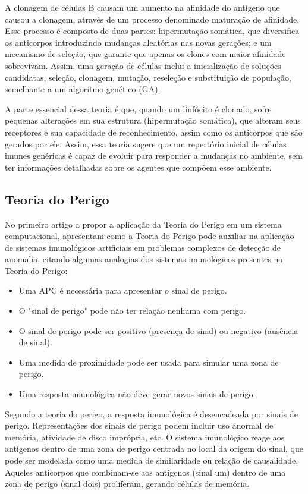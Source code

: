 A clonagem de células B causam um aumento na afinidade do antígeno que causou a clonagem, através de um processo denominado maturação de afinidade. Esse processo é composto de duas partes: hipermutação somática, que diversifica os anticorpos introduzindo mudanças aleatórias nas novas gerações; e um mecanismo de seleção, que garante que apenas os clones com maior afinidade sobrevivam. Assim, uma geração de células inclui a inicialização de soluções candidatas, seleção, clonagem, mutação, reseleção e substituição de população, semelhante a um algoritmo genético (GA).

A parte essencial dessa teoria é que, quando um linfócito é clonado, sofre pequenas alterações em sua estrutura (hipermutação somática), que alteram seus receptores e sua capacidade de reconhecimento, assim como os anticorpos que são gerados por ele. Assim, essa teoria sugere que um repertório inicial de células imunes genéricas é capaz de evoluir para responder a mudanças no ambiente, sem ter informações detalhadas sobre os agentes que compõem esse ambiente.

\subsection{Teoria do Perigo}

No primeiro artigo a propor a aplicação da Teoria do Perigo em um sistema computacional, \citeauthor{Aickelin2002} apresentam como a Teoria do Perigo pode auxiliar na aplicação de sistemas imunológicos artificiais em problemas complexos de detecção de anomalia, citando algumas analogias dos sistemas imunológicos presentes na Teoria do Perigo:

\begin{itemize}
    \item Uma APC é necessária para apresentar o sinal de perigo.
    \item O "sinal de perigo" pode não ter relação nenhuma com perigo.
    \item O sinal de perigo pode ser positivo (presença de sinal) ou negativo (ausência de sinal).
    \item Uma medida de proximidade pode ser usada para simular uma zona de perigo.
    \item Uma resposta imunológica não deve gerar novos sinais de perigo.
\end{itemize}

Segundo a teoria do perigo, a resposta imunológica é desencadeada por sinais de perigo. Representações dos sinais de perigo podem incluir uso anormal de memória, atividade de disco imprópria, etc. O sistema imunológico reage aos antígenos dentro de uma zona de perigo centrada no local da origem do sinal, que pode ser modelada como uma medida de similaridade ou relação de causalidade. Aqueles anticorpos que combinam-se aos antígenos (sinal um) dentro de uma zona de perigo (sinal dois) proliferam, gerando células de memória.

